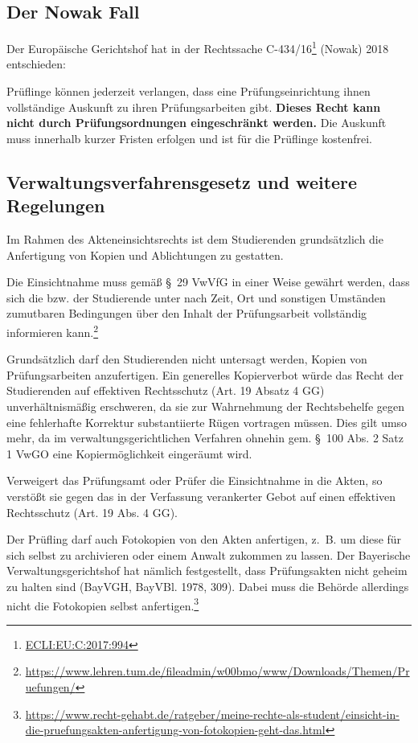 \documentclass[12pt, a4paper]{article}
\begin{document}
\subsection{Der Nowak Fall}
Der Europäische Gerichtshof hat in der Rechtssache C-434/16\footnote{\href{http://curia.europa.eu/juris/document/document.jsf;jsessionid=9ea7d0f130d5caea7f77b3784786a1dae42a55d82693.e34KaxiLc3eQc40LaxqMbN4PaNuKe0?text=&docid=198059&pageIndex=0&doclang=DE&mode=lst&dir=&occ=first&part=1&cid=1135575}{ECLI:EU:C:2017:994}} (Nowak) 2018 entschieden:

Prüflinge können jederzeit verlangen, dass eine Prüfungseinrichtung ihnen vollständige Auskunft zu ihren Prüfungsarbeiten gibt. \textbf{Dieses Recht kann nicht durch Prüfungsordnungen eingeschränkt werden.} Die Auskunft muss innerhalb kurzer Fristen erfolgen und ist für die Prüflinge kostenfrei. 

\subsection{Verwaltungsverfahrensgesetz und weitere Regelungen}
Im Rahmen des Akteneinsichtsrechts ist dem Studierenden grundsätzlich die Anfertigung von Kopien und Ablichtungen zu gestatten.

Die Einsichtnahme muss gemäß § 29 VwVfG in einer Weise gewährt werden, dass sich die bzw. der Studierende unter nach Zeit, Ort und sonstigen Umständen zumutbaren Bedingungen über den Inhalt der Prüfungsarbeit vollständig informieren kann.\footnote{\href{https://www.lehren.tum.de/fileadmin/w00bmo/www/Downloads/Themen/Pruefungen/Pruefungseinsichten_Version_6_2020.pdf}{https://www.lehren.tum.de/fileadmin/w00bmo/www/Downloads/Themen/Pruefungen/}}

Grundsätzlich darf den Studierenden nicht untersagt werden, Kopien von Prüfungsarbeiten anzufertigen.  Ein  generelles  Kopierverbot  würde  das  Recht  der  Studierenden  auf effektiven Rechtsschutz (Art. 19 Absatz 4 GG) unverhältnismäßig erschweren, da sie zur Wahrnehmung der Rechtsbehelfe gegen eine fehlerhafte Korrektur substantiierte Rügen vortragen müssen. Dies gilt umso mehr, da im verwaltungsgerichtlichen Verfahren ohnehin gem. § 100 Abs. 2 Satz 1 VwGO eine Kopiermöglichkeit eingeräumt wird.

Verweigert das Prüfungsamt oder Prüfer die Einsichtnahme in die Akten, so verstößt sie gegen das in der Verfassung verankerter Gebot auf einen effektiven Rechtsschutz (Art. 19 Abs. 4 GG).

Der Prüfling darf auch Fotokopien von den Akten anfertigen, z. B. um diese für sich selbst zu archivieren oder einem Anwalt zukommen zu lassen. Der Bayerische Verwaltungsgerichtshof hat nämlich festgestellt, dass Prüfungsakten nicht geheim zu halten sind (BayVGH, BayVBl. 1978, 309). Dabei muss die Behörde allerdings nicht die Fotokopien selbst anfertigen.\footnote{\href{https://www.recht-gehabt.de/ratgeber/meine-rechte-als-student/einsicht-in-die-pruefungsakten-anfertigung-von-fotokopien-geht-das.html}{https://www.recht-gehabt.de/ratgeber/meine-rechte-als-student/einsicht-in-die-pruefungsakten-anfertigung-von-fotokopien-geht-das.html}}
\end{document}
